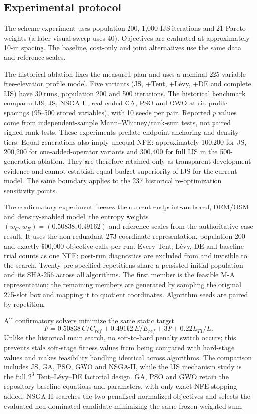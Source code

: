 \documentclass[preprint,12pt]{elsarticle}
\begin{document}
\subsection{Experimental protocol}

The scheme experiment uses population 200, 1,000 IJS iterations and 21 Pareto weights (a later visual sweep uses 40). Objectives are evaluated at approximately 10-m spacing. The baseline, cost-only and joint alternatives use the same data and reference scales.

The historical ablation fixes the measured plan and uses a nominal 225-variable free-elevation profile model. Five variants (JS, +Tent, +L\'evy, +DE and complete IJS) have 30 runs, population 200 and 500 iterations. The historical benchmark compares IJS, JS, NSGA-II, real-coded GA, PSO and GWO at six profile spacings (95--500 stored variables), with 10 seeds per pair. Reported $p$ values come from independent-sample Mann--Whitney/rank-sum tests, not paired signed-rank tests. These experiments predate endpoint anchoring and density tiers. Equal generations also imply unequal NFE: approximately 100,200 for JS, 200,200 for one-added-operator variants and 300,400 for full IJS in the 500-generation ablation. They are therefore retained only as transparent development evidence and cannot establish equal-budget superiority of IJS for the current model. The same boundary applies to the 237 historical re-optimization sensitivity points.

The confirmatory experiment freezes the current endpoint-anchored, DEM/OSM and density-enabled model, the entropy weights $(w_C,w_E)=(0.50838,0.49162)$ and reference scales from the authoritative case result. It uses the non-redundant 273-coordinate representation, population 200 and exactly 600,000 objective calls per run. Every Tent, L\'evy, DE and baseline trial counts as one NFE; post-run diagnostics are excluded from and invisible to the search. Twenty pre-specified repetitions share a persisted initial population and its SHA-256 across all algorithms. The first member is the feasible M-A representation; the remaining members are generated by sampling the original 275-slot box and mapping it to quotient coordinates. Algorithm seeds are paired by repetition.

All confirmatory solvers minimize the same static target
\begin{equation}
F=0.50838\,C/C_{ref}+0.49162\,E/E_{ref}+3P+0.22L_{T1}/L.
\end{equation}
Unlike the historical main search, no soft-to-hard penalty switch occurs; this prevents stale soft-stage fitness values from being compared with hard-stage values and makes feasibility handling identical across algorithms. The comparison includes JS, GA, PSO, GWO and NSGA-II, while the IJS mechanism study is the full $2^3$ Tent--L\'evy--DE factorial design. GA, PSO and GWO retain the repository baseline equations and parameters, with only exact-NFE stopping added. NSGA-II searches the two penalized normalized objectives and selects the evaluated non-dominated candidate minimizing the same frozen weighted sum.
\end{document}
